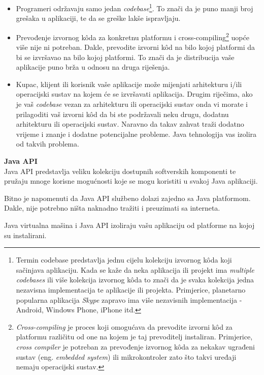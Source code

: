 \begin{itemize}
    \item Programeri održavaju samo jedan \emph{codebase}\footnote{Termin codebase predstavlja jednu cijelu kolekciju izvornog kôda koji sačinjava aplikaciju. Kada se kaže da neka aplikacija ili projekt ima \emph{multiple codebases} ili više kolekcija izvornog kôda to znači da je svaka kolekcija jedna nezavisna implementacija te aplikacije ili projekta. Primjerice, planetarno popularna aplikacija \emph{Skype} zapravo ima više nezavisnih implementacija - Android, Windows Phone, iPhone itd.}. To znači da je puno manji broj grešaka u aplikaciji, te da se greške lakše ispravljaju.
    
    \item Prevođenje izvornog kôda za konkretnu platformu i cross-compiling\footnote{\emph{Cross-compiling} je proces koji omogućava da prevodite izvorni kôd za platformu različitu od one na kojem je taj prevoditelj instaliran. Primjerice, \emph{cross compiler} je potreban za prevođenje izvornog kôda za nekakav ugrađeni sustav (eng. \emph{embedded system}) ili mikrokontroler zato što takvi uređaji nemaju operacijski sustav.} uopće više nije ni potreban. Dakle, prevodite izvorni kôd na bilo kojoj platformi da bi se izvršavao na bilo kojoj platformi. To znači da je distribucija vaše aplikacije puno brža u odnosu na druga riješenja.
    
    \item Kupac, klijent ili korisnik vaše aplikacije može mijenjati arhitekturu i/ili operacijski sustav na kojem će se izvršavati aplikacija. Drugim riječima, ako je vaš \emph{codebase} vezan za arhitekturu ili operacijski sustav onda vi morate i prilagoditi vaš izvorni kôd da bi ste podržavali neku drugu, dodatnu arhitekturu ili operacijski sustav. Naravno da takav zahvat traži dodatno vrijeme i znanje i dodatne potencijalne probleme. Java tehnologija vas izolira od takvih problema.
\end{itemize}

\textbf{Java API}\\
Java API predstavlja veliku kolekciju dostupnih softverskih komponenti te pružaju mnoge korisne mogućnosti koje se mogu koristiti u svakoj Java aplikaciji.

Bitno je napomenuti da Java API službeno dolazi zajedno sa Java platformom. Dakle, nije potrebno ništa naknadno tražiti i preuzimati sa interneta.

\begin{infobox}
    Java virtualna mašina i Java API izoliraju vašu aplikaciju od platforme na kojoj su instalirani.
\end{infobox}

